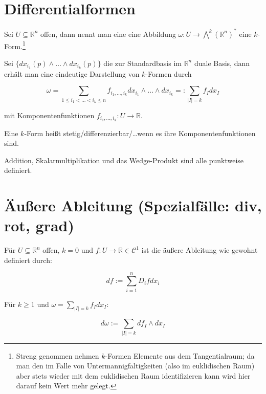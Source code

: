 \section{Differentialformen}
\begin{definition}[$k$-Form]
	Sei $U\subseteq \mathbb R^n$ offen, dann nennt man eine eine Abbildung $\omega:U \rightarrow \bigwedge^k(\mathbb R^n)^*$ eine $k$-Form.\footnote{Streng genommen nehmen $k$-Formen Elemente aus dem Tangentialraum; da man den im Falle von Untermannigfaltigkeiten (also im euklidischen Raum) aber stets wieder mit dem euklidischen Raum identifizieren kann wird hier darauf kein Wert mehr gelegt.}
\end{definition}
\begin{remark}
	Sei $\{dx_{i_1}(p)\wedge\dots\wedge dx_{i_k}(p)\}$ die zur Standardbasis im $\mathbb R^n$ duale Basis, dann erh\"alt man eine eindeutige Darstellung von $k$-Formen durch
	
	$$\omega = \sum_{1\leq i_1<\dots<i_k\leq n}f_{i_1,\dots,i_k}dx_{i_1}\wedge\dots\wedge dx_{i_k} =: \sum_{|I|=k}f_I dx_I$$
	
	mit Komponentenfunktionen $f_{i_1,\dots,i_k}:U\rightarrow \mathbb R$.
\end{remark}
\begin{definition}
	Eine $k$-Form hei\ss t stetig/differenzierbar/\dots wenn es ihre Komponentenfunktionen sind.
\end{definition}

\begin{definition}
	Addition, Skalarmultiplikation und das Wedge-Produkt sind alle punktweise definiert.
\end{definition}





\section{\"Au\ss ere Ableitung (Spezialf\"alle: div, rot, grad)}
\begin{definition}
	F\"ur $U\subseteq\mathbb R^n$ offen, $k=0$ und $f:U\rightarrow \mathbb R \in \mathcal C^1$ ist die \"au\ss ere Ableitung wie gewohnt definiert durch:

	$$df:=\sum_{i=1}^n D_i fdx_i$$

	F\"ur $k\geq 1$ und $\omega = \sum_{|I|=k}f_I dx_I$:

$$d\omega := \sum_{|I|=k}df_I\wedge dx_I$$
\end{definition}

